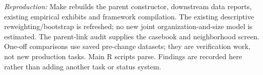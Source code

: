 \textit{Reproduction:} Make rebuilds the parent constructor, downstream data reports, existing empirical exhibits and framework compilation. The existing descriptive reweighting/bootstrap is refreshed; no new joint organization-and-size model is estimated. The parent-link audit supplies the casebook and neighborhood screen. One-off comparisons use saved pre-change datasets; they are verification work, not new production tasks. Main R scripts parse. Findings are recorded here rather than adding another task or status system.
